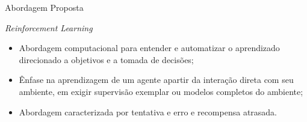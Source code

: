 \documentclass[aspectratio=169]{beamer}
\begin{document}

           
           
	

\begin{frame}{Abordagem Proposta}
	\begin{block}{\textit{Reinforcement Learning}}
		\begin{itemize}
			\item Abordagem computacional para entender e automatizar o aprendizado direcionado a objetivos e a tomada de decisões;
			\item Ênfase na aprendizagem de um agente apartir da interação direta com seu ambiente, em exigir supervisão exemplar ou modelos completos do ambiente;
			\item Abordagem caracterizada por tentativa e erro e recompensa atrasada.
		\end{itemize}
	\end{block}
\end{frame}
\end{document}
